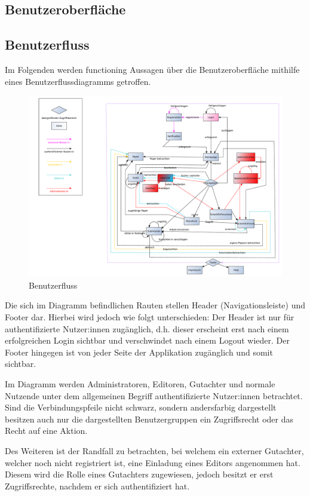 \subsection{Benutzeroberfläche}

\subsection{Benutzerfluss}
Im Folgenden werden functioning Aussagen über die Benutzeroberfläche mithilfe eines Benutzerflussdiagramms getroffen.

\begin{figure}[H]
    \centering
    \includegraphics[width=\linewidth]{graphics/benutzerFlussyEd}
    \caption{Benutzerfluss}
\end{figure}

Die sich im Diagramm befindlichen Rauten stellen Header (Navigationsleiste) und Footer dar.
Hierbei wird jedoch wie folgt unterschieden: Der Header ist nur für authentifizierte Nutzer:innen zugänglich,
d.h. dieser erscheint erst nach einem erfolgreichen Login sichtbar und verschwindet nach einem Logout wieder.
Der Footer hingegen ist von jeder Seite der Applikation zugänglich und somit sichtbar.

Im Diagramm werden Administratoren, Editoren, Gutachter und normale Nutzende unter dem allgemeinen Begriff
authentifizierte Nutzer:innen betrachtet.
Sind die Verbindungspfeile nicht schwarz, sondern andersfarbig dargestellt besitzen auch nur die
dargestellten Benutzergruppen ein Zugriffsrecht oder das Recht auf eine Aktion.

Des Weiteren ist der Randfall zu betrachten, bei welchem ein externer Gutachter, welcher noch nicht registriert ist,
eine Einladung eines Editors angenommen hat.
Diesem wird die Rolle eines Gutachters zugewiesen, jedoch besitzt er erst Zugriffsrechte, nachdem er sich
authentifiziert hat.